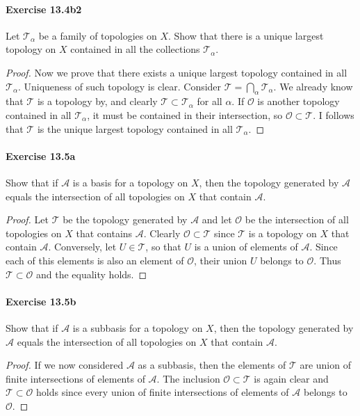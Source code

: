 \documentclass{article}
\begin{document}
\paragraph{Exercise 13.4b2} Let $\mathcal{T}_\alpha$ be a family of topologies on $X$. Show that there is a unique largest topology on $X$ contained in all the collections $\mathcal{T}_\alpha$.
\begin{proof}
    Now we prove that there exists a unique largest topology contained in all $\mathcal{T}_\alpha$. Uniqueness of such topology is clear. Consider $\mathcal{T}=\bigcap_\alpha \mathcal{T}_\alpha$. We already know that $\mathcal{T}$ is a topology by, and clearly $\mathcal{T} \subset \mathcal{T}_\alpha$ for all $\alpha$. If $\mathcal{O}$ is another topology contained in all $\mathcal{T}_\alpha$, it must be contained in their intersection, so $\mathcal{O} \subset \mathcal{T}$. I follows that $\mathcal{T}$ is the unique largest topology contained in all $\mathcal{T}_\alpha$.
\end{proof}



\paragraph{Exercise 13.5a} Show that if $\mathcal{A}$ is a basis for a topology on $X$, then the topology generated by $\mathcal{A}$ equals the intersection of all topologies on $X$ that contain $\mathcal{A}$.
\begin{proof}
    Let $\mathcal{T}$ be the topology generated by $\mathcal{A}$ and let $\mathcal{O}$ be the intersection of all topologies on $X$ that contains $\mathcal{A}$. Clearly $\mathcal{O} \subset \mathcal{T}$ since $\mathcal{T}$ is a topology on $X$ that contain $\mathcal{A}$. Conversely, let $U \in \mathcal{T}$, so that $U$ is a union of elements of $\mathcal{A}$. Since each of this elements is also an element of $\mathcal{O}$, their union $U$ belongs to $\mathcal{O}$. Thus $\mathcal{T} \subset \mathcal{O}$ and the equality holds.
\end{proof}



\paragraph{Exercise 13.5b} Show that if $\mathcal{A}$ is a subbasis for a topology on $X$, then the topology generated by $\mathcal{A}$ equals the intersection of all topologies on $X$ that contain $\mathcal{A}$.
\begin{proof}
    If we now considered $\mathcal{A}$ as a subbasis, then the elements of $\mathcal{T}$ are union of finite intersections of elements of $\mathcal{A}$. The inclusion $\mathcal{O} \subset \mathcal{T}$ is again clear and $\mathcal{T} \subset \mathcal{O}$ holds since every union of finite intersections of elements of $\mathcal{A}$ belongs to $\mathcal{O}$.
\end{proof}
\end{document}
